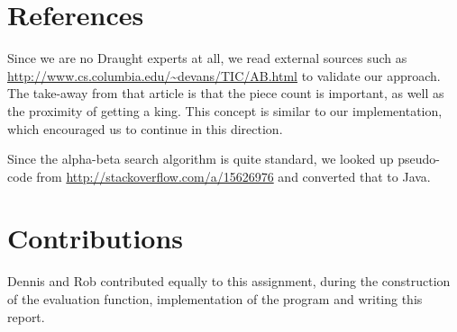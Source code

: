 \documentclass[11pt,a4paper]{article}
\begin{document}
\section{References}
Since we are no Draught experts at all, we read external sources such as \url{http://www.cs.columbia.edu/~devans/TIC/AB.html} to validate our approach. The take-away from that article is that the piece count is important, as well as the proximity of getting a king. This concept is similar to our implementation, which encouraged us to continue in this direction.

Since the alpha-beta search algorithm is quite standard, we looked up pseudo-code from \url{http://stackoverflow.com/a/15626976} and converted that to Java.

\section{Contributions}
Dennis and Rob contributed equally to this assignment, during the construction of the evaluation function, implementation of the program and writing this report.
\end{document}
